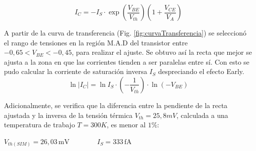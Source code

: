 \documentclass[10pt]{article}
\begin{document}
\begin{equation}
    I_C = -I_S \cdot  \exp{\left({\frac{V_{BE}}{V_{th}}} \right) \left({1 + \frac{V_{CE}}{V_A}} \right)}  
    \label{ref: ecuacionIC}
\end{equation}

A partir de la curva de transferencia (Fig. \ref{fig:curvaTransferencia}) se seleccionó el rango de tensiones en la región M.A.D del transistor entre $-0,65 < V_{BE} < -0,45$, para realizar el ajuste. Se obtuvo así la recta que mejor se ajusta a la zona en que las corrientes tienden a ser paralelas entre sí. Con esto se pudo calcular la corriente de saturación inversa $I_S$ despreciando el efecto Early.
\begin{equation}
    \ln{|I_C|} = \ln{I_S} \cdot \left( -\frac{1}{V_{th}}\right) \cdot \ln{(-V_{BE})}
\end{equation}

Adicionalmente, se verifica que la diferencia entre la pendiente de la recta ajustada y la inversa de la tensión térmica $V_{th} = 25,8mV$, calculada a una temperatura de trabajo $T = 300 K$, es menor al $1\%$:


\begin{center}
    $V_{th (SIM)} = 26,03\, \mathrm{mV} \qquad \qquad I_S = 333\, \mathrm{fA}$
\end{center}
\end{document}
